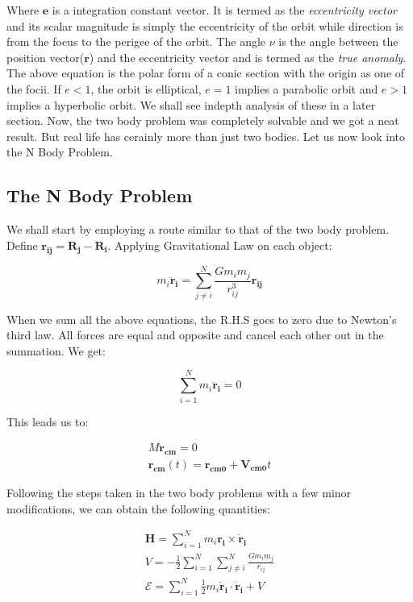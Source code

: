 \documentclass[12pt, letterpaper]{article}
\begin{document}
Where $\mathbf{e}$ is a integration constant vector. It is termed as the \textit{eccentricity vector} and its scalar magnitude is simply the eccentricity of the orbit while direction is from the focus to the perigee of the orbit. The angle $\nu$ is the angle between the position vector($\mathbf{r}$) and the eccentricity vector and is termed as the \textit{true anomaly}. The above equation is the polar form of a conic section with the origin as one of the focii. If $e < 1$, the orbit is elliptical, $e = 1$ implies a parabolic orbit and $e > 1$ implies a hyperbolic orbit. We shall see indepth analysis of these in a later section. Now, the two body problem was completely solvable and we got a neat result. But real life has cerainly more than just two bodies. Let us now look into the N Body Problem.

\subsection{The N Body Problem}

We shall start by employing a route similar to that of the two body problem. Define $ \mathbf{r_{ij}} = \mathbf{R_{j}} - \mathbf{R_{i}}$. Applying Gravitational Law on each object:

\begin{displaymath}
m_i\mathbf{\ddot{r}_i} = \sum_{j \neq i}^{N} \frac{Gm_im_j}{r_{ij}^3}\mathbf{r_{ij}}
\end{displaymath}

When we sum all the above equations, the R.H.S goes to zero due to Newton's third law. All forces are equal and opposite and cancel each other out in the summation. We get:

\begin{displaymath}
\sum_{i=1}^{N} m_i\mathbf{\ddot{r}_i} = 0
\end{displaymath}

This leads us to:

\begin{gather*}
M\mathbf{\ddot{r}_{cm}} = 0\\
\mathbf{r_{cm}}(t) = \mathbf{r_{cm0}} + \mathbf{V_{cm0}}t
\end{gather*}

Following the steps taken in the two body problems with a few minor modifications, we can obtain the following quantities:

\begin{gather*}
\mathbf{H} = \sum_{i=1}^{N} m_i\mathbf{r_i}\times\mathbf{\dot{r}_i}\\
V = -\frac{1}{2}\sum_{i=1}^{N}\sum_{j \neq i}^{N}\frac{Gm_im_j}{r_{ij}}\\
\mathcal{E} = \sum_{i=1}^{N}\frac{1}{2}m_i\mathbf{\dot{r}_i}\cdot\mathbf{\dot{r}_i} + V
\end{gather*}
\end{document}
